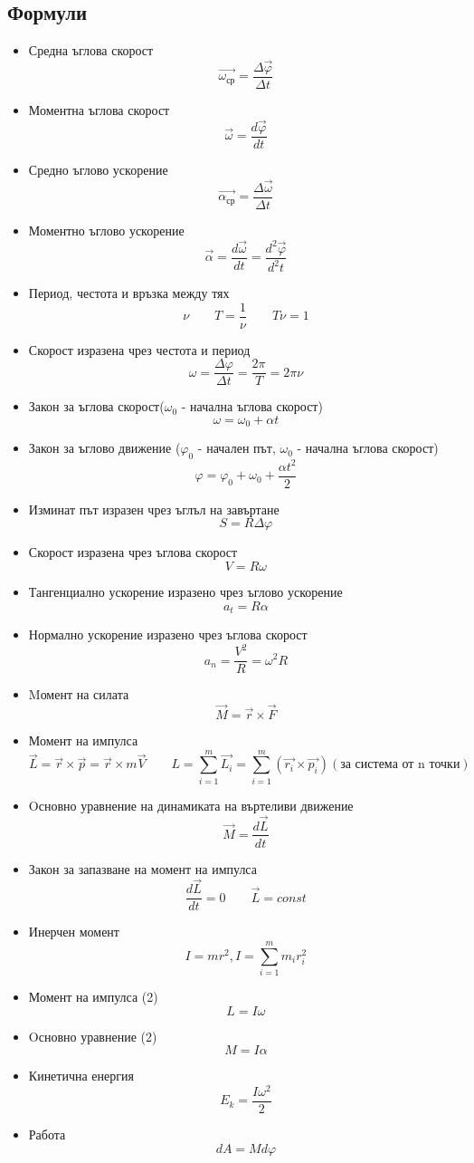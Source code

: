 \documentclass[fleqn, 12pt]{article}
\theoremstyle{definition}
\begin{document}
\subsection{Формули}

\begin{itemize}
\item Средна ъглова скорост
$$\vec{\omega_{\text{ср}}} = \frac{\Delta \vec{\varphi}}{\Delta t}$$
\item Моментна ъглова скорост
$$\vec{\omega} = \frac{d\vec{\varphi}}{dt}$$
\item Средно ъглово ускорение
$$\vec{\alpha_{\text{ср}}} = \frac{\Delta \vec{\omega}}{\Delta t}$$
\item Моментно ъглово ускорение
$$\vec{\alpha} = \frac{d\vec{\omega}}{dt} = \frac{d^2 \vec{\varphi}}{d^2 t}$$
\item Период, честота и връзка между тях
$$\nu \qquad T = \frac{1}{\nu} \qquad T\nu = 1$$
\item Скорост изразена чрез честота и период
$$\omega = \frac{\Delta \varphi}{\Delta t} = \frac{2 \pi }{T} = 2 \pi \nu$$
\item Закон за ъглова скорост($\omega_0$ - начална ъглова скорост)
$$\omega = \omega_0 + \alpha t$$
\item Закон за ъглово движение ($\varphi_0$ - начален път, $\omega_0$ - начална ъглова скорост)
$$\varphi = \varphi_0 + \omega_0 + \frac{\alpha t^2}{2}$$
\item Изминат път изразен чрез ъглъл на завъртане
$$S = R \Delta \varphi $$
\item Скорост изразена чрез ъглова скорост
$$V = R \omega$$
\item Тангенциално ускорение изразено чрез ъглово ускорение
$$a_t = R \alpha$$
\item Нормално ускорение изразено чрез ъглова скорост
$$a_n = \frac{V^2}{R} = \omega^2 R$$
\item Mомент на силата
$$\vec{M} = \vec{r} \times \vec{F}$$
\item Момент на импулса 
$$\vec{L} = \vec{r} \times \vec{p} = \vec{r} \times m \vec{V} \qquad L = \sum_{i=1} ^m \vec{L_i} = \sum_{i=1} ^m \left( \vec{r_i} \times \vec{p_i}\right) (\text{за система от n точки})$$
\item Oсновно уравнение на динамиката на въртеливи движение
$$\vec{M} = \frac{d \vec{L}}{dt}$$
\item Закон за запазване на момент на импулса
$$\frac{d \vec{L}}{dt} = 0 \qquad \vec{L} = const$$
\item Инерчен момент
$$I = mr^2, I = \sum_{i=1} ^m m_i r_i ^2$$
\item Момент на импулса (2)
$$L = I \omega$$
\item Oсновно уравнение (2)
$$M = I \alpha$$
\item Кинетична енергия 
$$E_k = \frac{I \omega^2}{2}$$
\item Работа
$$dA = M d\varphi$$
\end{itemize}
\end{document}
